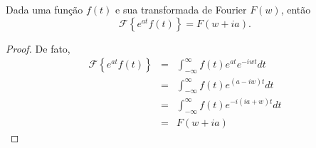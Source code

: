 \begin{teo}\label{prop_desl_w} Dada uma função $f(t)$ e sua transformada de Fourier $F(w)$, então
\begin{equation}
\mathcal{F}\left\{e^{at}f(t)\right\}=F(w+ia).
\end{equation}
\end{teo}
\begin{proof}
De fato,
\begin{eqnarray*}
\mathcal{F}\left\{e^{at}f(t)\right\}&=&\int_{-\infty}^\infty  f(t)e^{at}e^{-iwt}dt \\
&=&\int_{-\infty}^\infty   f(t)e^{(a-iw)t}dt \\
&=&\int_{-\infty}^\infty   f(t)e^{-i(ia+w)t}dt \\
&=&F(w+ia) 
\end{eqnarray*}
\end{proof}
